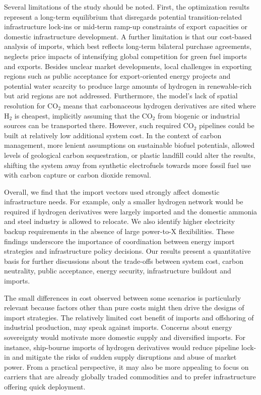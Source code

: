 Several limitations of the study should be noted. First, the optimization
results represent a long-term equilibrium that disregards potential
transition-related infrastructure lock-ins or mid-term ramp-up constraints of
export capacities or domestic infrastructure development. A further limitation
is that our cost-based analysis of imports, which best reflects long-term
bilateral purchase agreements, neglects price impacts of intensifying global
competition for green fuel imports and exports.\cite{galimovaGlobalTrading2023a}
Besides unclear market developments, local challenges in exporting regions such
as public acceptance for export-oriented energy
projects\cite{ishmamMappingLocalGreen2024} and potential water
scarcity\cite{franzmannGreenHydrogenCostpotentials2023,terlouwFutureHydrogenEconomies2024}
to produce large amounts of hydrogen in renewable-rich but arid regions are not
addressed. Furthermore, the model's lack of spatial resolution for CO$_2$ means
that carbonaceous hydrogen derivatives are sited where H$_2$ is cheapest,
implicitly assuming that the CO$_2$ from biogenic or industrial sources can be
transported there. However, such required CO$_2$ pipelines could be built at
relatively low additional system cost.\cite{hofmannH2CO2Network2024} In the
context of carbon management, more lenient assumptions on sustainable biofuel
potentials, allowed levels of geological carbon sequestration, or plastic
landfill could alter the results, shifting the system away from synthetic
electrofuels towards more fossil fuel use with carbon capture or carbon dioxide
removal.\cite{hofmannH2CO2Network2024,millingerDiversityBiomassUsage2023}

Overall, we find that the import vectors used strongly affect domestic
infrastructure needs. For example, only a smaller hydrogen network would be
required if hydrogen derivatives were largely imported and the domestic ammonia
and steel industry is allowed to relocate. We also identify higher electricity
backup requirements in the absence of large power-to-X flexibilities. These
findings underscore the importance of coordination between energy import
strategies and infrastructure policy decisions. Our results present a
quantitative basis for further discussions about the trade-offs between system
cost, carbon neutrality, public acceptance, energy security, infrastructure
buildout and imports.

The small differences in cost observed between some scenarios is particularly
relevant because factors other than pure costs might then drive the designs of
import strategies. The relatively limited cost benefit of imports and offshoring
of industrial production, may speak against imports. Concerns about energy
sovereignty would motivate more domestic supply and diversified imports. For
instance, ship-bourne imports of hydrogen derivatives would reduce pipeline
lock-in and mitigate the risks of sudden supply disruptions and abuse of market
power.  From a practical perspective, it may also be more appealing to focus on
carriers that are already globally traded commodities and to prefer
infrastructure offering quick deployment.

